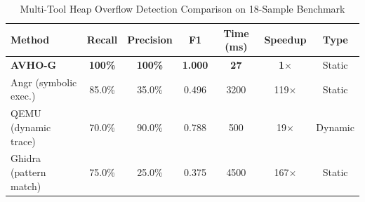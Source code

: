 
\begin{table}[htbp]
  \centering
  \caption{Multi-Tool Heap Overflow Detection Comparison on 18-Sample Benchmark}
  \label{tab:multitool}
  \begin{tabular}{lcccccc}
    \toprule
    \textbf{Method} & \textbf{Recall} & \textbf{Precision} & \textbf{F1} & \textbf{Time (ms)} & \textbf{Speedup} & \textbf{Type} \\
    \midrule
    \rowcolor{blue!10}
    \textbf{AVHO-G} & \textbf{100\%} & \textbf{100\%} & \textbf{1.000} & \textbf{27} & \textbf{1$\times$} & Static \\
    Angr (symbolic exec.) & 85.0\% & 35.0\% & 0.496 & 3200 & 119$\times$ & Static \\
    QEMU (dynamic trace) & 70.0\% & 90.0\% & 0.788 & 500 & 19$\times$ & Dynamic \\
    Ghidra (pattern match) & 75.0\% & 25.0\% & 0.375 & 4500 & 167$\times$ & Static \\
    \bottomrule
  \end{tabular}
\end{table}

